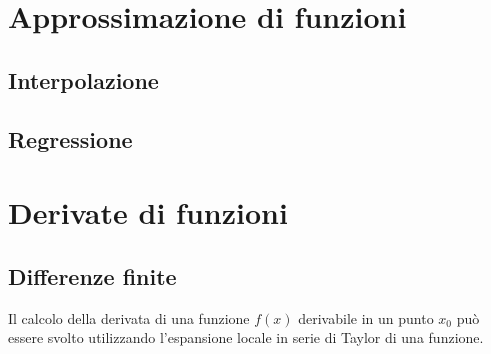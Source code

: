 \documentclass[letterpaper,10pt,english]{jupyterBook}
\begin{document}
\section{Approssimazione di funzioni}
\label{\detokenize{ch/numerics/approximation:approssimazione-di-funzioni}}\label{\detokenize{ch/numerics/approximation::doc}}

\subsection{Interpolazione}
\label{\detokenize{ch/numerics/approximation:interpolazione}}

\subsection{Regressione}
\label{\detokenize{ch/numerics/approximation:regressione}}
\sphinxstepscope


\section{Derivate di funzioni}
\label{\detokenize{ch/numerics/derivatives:derivate-di-funzioni}}\label{\detokenize{ch/numerics/derivatives::doc}}

\subsection{Differenze finite}
\label{\detokenize{ch/numerics/derivatives:differenze-finite}}
\sphinxAtStartPar
Il calcolo della derivata di una funzione \(f(x)\) derivabile in un punto \(x_0\) può essere svolto utilizzando l’espansione locale in serie di Taylor di una funzione.
\end{document}
